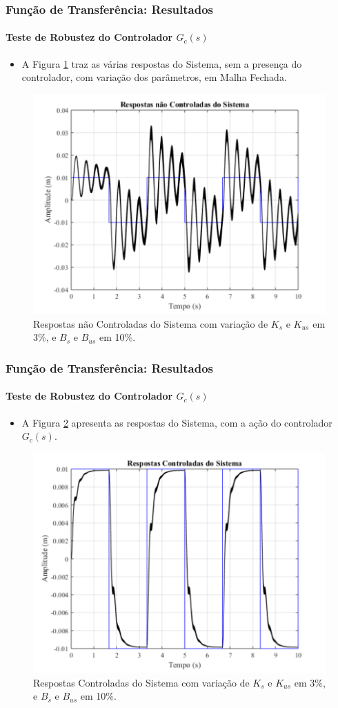 \documentclass{beamer}
\begin{document}
\begin{frame}
\frametitle{Função de Transferência: Resultados}
\framesubtitle{Teste de Robustez do Controlador $G_c(s)$}
\begin{itemize}
\item A Figura \ref{sistemaIntervalar} traz as várias respostas do Sistema, sem a presença do controlador, com variação dos parâmetros, em Malha Fechada.
\end{itemize}
\begin{figure}[H]
	\centering
\includegraphics[width=.5\columnwidth]{./imagens/resposta_sistema_variando_Ks_Kus_Bs_Bus.pdf}
    \renewcommand{\figurename}{Fig. 9}
    \caption{Respostas não Controladas do Sistema com variação de $K_s$ e $K_{us}$ em 3\%, e $B_s$ e $B_{us}$ em 10\%.}
	\label{sistemaIntervalar}
\end{figure}
\end{frame}

\begin{frame}
\frametitle{Função de Transferência: Resultados}
\framesubtitle{Teste de Robustez do Controlador $G_c(s)$}
\begin{itemize}
\item A Figura \ref{controladaIntervalar} apresenta as respostas do Sistema, com a ação do controlador $G_c(s)$.
\end{itemize}
\begin{figure}[H]
	\centering
\includegraphics[width=.5\columnwidth]{./imagens/resposta_controlada_variando_Ks_Kus_Bs_Bus_controlador_sem_robustez.pdf}
    \renewcommand{\figurename}{Fig. 10}
    \caption{Respostas Controladas do Sistema com variação de $K_s$ e $K_{us}$ em 3\%, e $B_s$ e $B_{us}$ em 10\%.}
	\label{controladaIntervalar}
\end{figure}
\end{frame}
\end{document}
